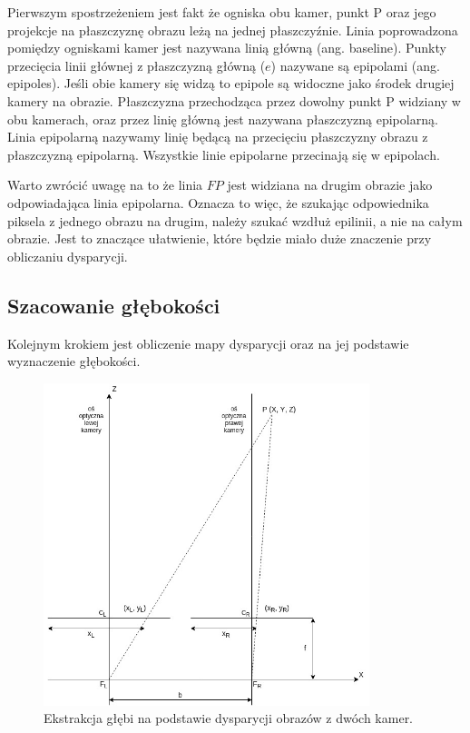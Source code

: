 \documentclass[oneside, eng]{mgr}
\begin{document}
Pierwszym spostrzeżeniem jest fakt że ogniska obu kamer, punkt P oraz jego projekcje na płaszczyznę obrazu leżą na jednej płaszczyźnie. Linia poprowadzona pomiędzy ogniskami kamer jest nazywana linią główną (ang. baseline). 
Punkty przecięcia linii głównej z płaszczyzną główną ($e$) nazywane są epipolami (ang. epipoles). Jeśli obie kamery się widzą to epipole są widoczne jako środek drugiej kamery na obrazie.
Płaszczyzna przechodząca przez dowolny punkt P widziany w obu kamerach, oraz przez linię główną jest nazywana płaszczyzną epipolarną.
Linia epipolarną nazywamy linię będącą na przecięciu płaszczyzny obrazu z płaszczyzną epipolarną. Wszystkie linie epipolarne przecinają się w epipolach.

Warto zwrócić uwagę na to że linia $F P$ jest widziana na drugim obrazie jako odpowiadająca linia epipolarna. Oznacza to więc, że szukając odpowiednika piksela z jednego obrazu na drugim, należy szukać wzdłuż epilinii, a nie na całym obrazie. Jest to znaczące ułatwienie, które będzie miało duże znaczenie przy obliczaniu dysparycji.

\subsection{Szacowanie głębokości}

Kolejnym krokiem jest obliczenie mapy dysparycji oraz na jej podstawie wyznaczenie głębokości. 

\begin{figure}
	\centering
	\includegraphics[width=9.5cm]{ekstrakcja.jpg}
	\caption{Ekstrakcja głębi na podstawie dysparycji obrazów z dwóch kamer. }
	\label{fig:extraction}
\end{figure}
\end{document}
